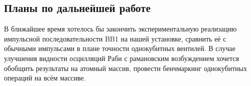 \subsection{Планы по дальнейшей работе}

В ближайшее время хотелось бы закончить экспериментальную реализацию импульсной последовательности BB1 на нашей установке, сравнить её с обычными импульсами в плане точности однокубитных вентилей. В случае улучшения видности осцилляций Раби с рамановским возбуждением хочется обобщить результаты на атомный массив, провести бенчмаркинг однокубитных операций на всём массиве. 

\newpage